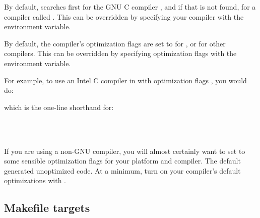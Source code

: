 By default,  searches first for the GNU C compiler
, and if that is not found, for a compiler called . 
This can be overridden by specifying your compiler with the 
environment variable.

By default, the compiler's optimization flags are set to
 for , or  for other compilers.
This can be overridden by specifying optimization flags with the
 environment variable. 

For example, to use an Intel C compiler in
 with 
optimization flags , you would do:


which is the one-line shorthand for:

\\
\\

If you are using a non-GNU compiler, you will almost certainly want to
set  to some sensible optimization flags for your
platform and compiler. The  default generated unoptimized
code. At a minimum, turn on your compiler's default optimizations with
.

\begin{comment}
\subsection{Example configuration}

The Intel GNU/Linux version installed at Janelia Farm is configured as
follows:

{\scriptuser{env CFLAGS="-O3" ./configure --enable-mpi --enable-lfs --prefix=/usr/local/infernal-1}}
\end{comment}

\subsection{Makefile targets}

